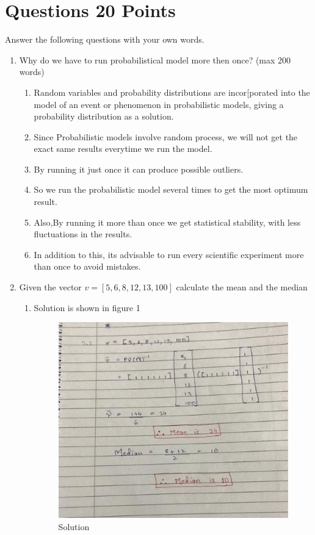 \documentclass{resources/WeSTassignment}
\begin{document}
\section{Questions \hfill{20 Points}}
Answer the following questions with your own words.  
\begin{enumerate}
    \item Why do we have to run probabilistical model more then once? (max 200 words)
    \begin{enumerate}
    \item Random variables and probability distributions are incor[porated into the model of an event or phenomenon in probabilistic models, giving a probability distribution as a solution.
    \item Since Probabilistic models involve random process, we will not get the exact same results everytime we run the model.
	\item By running it just once it can produce possible outliers.
	\item So we run the probabilistic model several times to get the most optimum result.
	\item Also,By running it more than once we get statistical stability, with less fluctuations in the results.
	\item In addition to this, its advisable to run every scientific experiment more than once to avoid mistakes.
	\end{enumerate}
    \item Given the vector $v = [5,6,8,12,13,100]$ calculate the mean and the median
    \begin{enumerate}
    \item Solution is shown in figure 1 \begin{figure}[h]
    \centering
    \includegraphics[scale=1]{resources/vector.JPG}
    \caption{Solution}  
    \label{fig:Solution}
\end{figure}
    \end{enumerate}
    

\end{enumerate}
\end{document}
